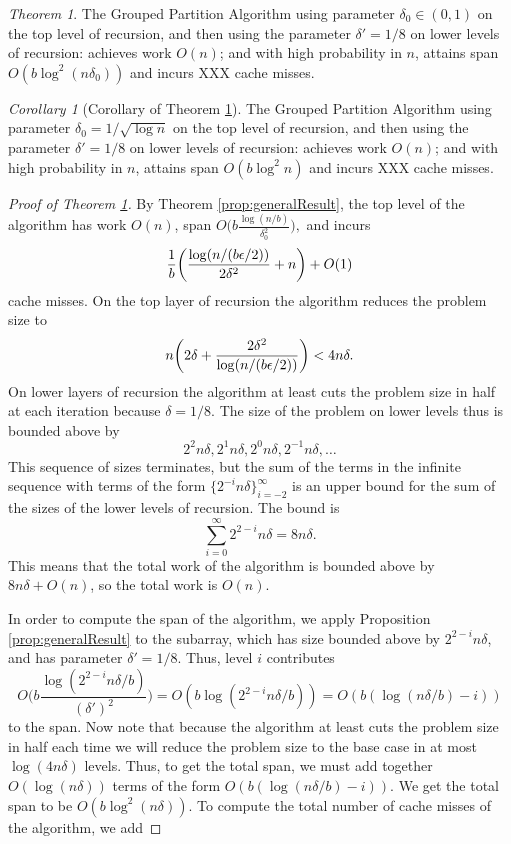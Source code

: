 \documentclass[sigconf]{acmart}
\DeclarePairedDelimiter{\paren}{(}{)}
\theoremstyle{remark}
\newtheorem{theorem}{Theorem}[section]
\newtheorem{corollary}[thm]{Corollary}
\theoremstyle{remark}
\begin{document}
\begin{theorem}
	\label{thm:groupedPartitionAlg}
	The Grouped Partition Algorithm using parameter $\delta_0\in(0,1)$ on the top level of recursion, and then using the parameter $\delta'=1/8$ on lower levels of recursion: achieves work $O(n)$; and with high probability in $n$, attains span $O(b\log^2 (n\delta_0))$ and incurs XXX cache misses. 
\end{theorem}
\begin{corollary}[Corollary of Theorem \ref{thm:groupedPartitionAlg}]
	\label{cor:groupedPartitionAlg}
	The Grouped Partition Algorithm using parameter $\delta_0=1/\sqrt{\log n}$ on the top level of recursion, and then using the parameter $\delta'=1/8$ on lower levels of recursion:
	achieves work $O(n)$; and with high probability in $n$, attains span $O(b\log^2 n)$ and incurs XXX cache misses. 
\end{corollary}
\begin{proof}[Proof of Theorem \ref{thm:groupedPartitionAlg}]
	By Theorem \ref{prop:generalResult}, the top level of the algorithm has work $O(n)$, span $O\Big(b\frac{\log(n/b)}{\delta_0^2}\Big),$ and incurs $$\frac{1}{b}\paren*{\frac{\log (n/(b\epsilon/2))}{2\delta^2}+n} + O(1)$$ cache misses.  
	On the top layer of recursion the algorithm reduces the problem size to $$n\paren*{2\delta + \frac{2\delta^2}{\log (n/(b\epsilon/2))}} < 4n\delta.$$
	On lower layers of recursion the algorithm at least cuts the problem size in half at each iteration because $\delta = 1/8$.
	The size of the problem on lower levels thus is bounded above by
	$$2^2n\delta, 2^1n\delta,2^0n\delta, 2^{-1}n\delta, \ldots$$
	This sequence of sizes terminates, but the sum of the terms in the infinite sequence with terms of the form $\{2^{-i}n\delta\}_{i=-2}^{\infty}$ is an upper bound for the sum of the sizes of the lower levels of recursion. The bound is
	 $$\sum_{i=0}^{\infty}2^{2-i}n\delta = 8n\delta.$$
	This means that the total work of the algorithm is bounded above by $8n\delta +O(n)$, so the total work is $O(n)$.
	
	In order to compute the span of the algorithm, we apply Proposition \ref{prop:generalResult} to the subarray, which has size bounded above by $2^{2-i}n\delta$, and has parameter $\delta'=1/8$. Thus, level $i$ contributes
	$$O\Big(b\frac{\log(2^{2-i}n\delta/b)}{(\delta')^2}\Big)=O(b\log(2^{2-i}n\delta/b))=O(b(\log(n\delta/b)-i))$$ to the span.
	Now note that because the algorithm at least cuts the problem size in half each time we will reduce the problem size to the base case in at most $\log (4n\delta)$ levels.
	Thus, to get the total span, we must add together $O(\log(n\delta))$ terms of the form $O(b(\log (n\delta/b) - i))$.
	We get the total span to be $O(b\log^2 (n\delta))$.
	To compute the total number of cache misses of the algorithm, we add 
\end{proof}
\end{document}
